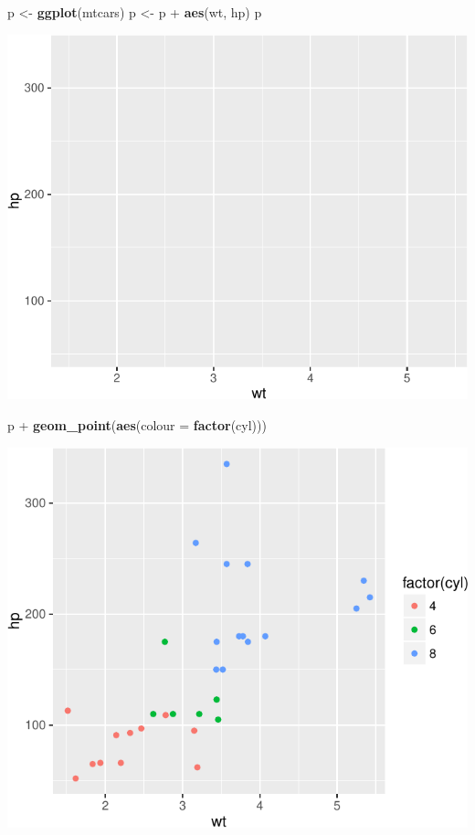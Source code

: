 \documentclass[]{article}
\newenvironment{Shaded}{\begin{snugshade}}{\end{snugshade}}
\newcommand{\KeywordTok}[1]{\textcolor[rgb]{0.13,0.29,0.53}{\textbf{{#1}}}}
\newcommand{\DataTypeTok}[1]{\textcolor[rgb]{0.13,0.29,0.53}{{#1}}}
\newcommand{\StringTok}[1]{\textcolor[rgb]{0.31,0.60,0.02}{{#1}}}
\newcommand{\NormalTok}[1]{{#1}}
\numberwithin{equation}{section}
\begin{document}
\begin{Shaded}
\begin{Highlighting}[]
\NormalTok{p <-}\StringTok{ }\KeywordTok{ggplot}\NormalTok{(mtcars)}
\NormalTok{p <-}\StringTok{ }\NormalTok{p +}\StringTok{ }\KeywordTok{aes}\NormalTok{(wt, hp)}
\NormalTok{p}
\end{Highlighting}
\end{Shaded}

\includegraphics{index_files/figure-latex/unnamed-chunk-235-8.pdf}

\begin{Shaded}
\begin{Highlighting}[]
\NormalTok{p +}\StringTok{ }\KeywordTok{geom_point}\NormalTok{(}\KeywordTok{aes}\NormalTok{(}\DataTypeTok{colour =} \KeywordTok{factor}\NormalTok{(cyl)))}
\end{Highlighting}
\end{Shaded}

\includegraphics{index_files/figure-latex/unnamed-chunk-235-9.pdf}
\end{document}
